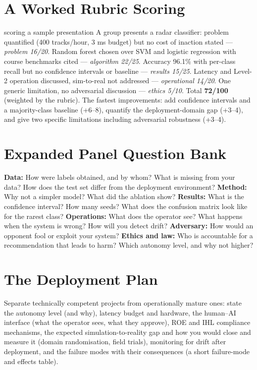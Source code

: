\documentclass[11pt]{article}
\begin{document}
\section{A Worked Rubric Scoring}
\begin{example}{scoring a sample presentation}
A group presents a radar classifier: problem quantified (400 tracks/hour, 3 ms budget) but no cost of inaction stated --- \emph{problem 16/20}. Random forest chosen over SVM and logistic regression with course benchmarks cited --- \emph{algorithm 22/25}. Accuracy 96.1\% with per-class recall but no confidence intervals or baseline --- \emph{results 15/25}. Latency and Level-2 operation discussed, sim-to-real not addressed --- \emph{operational 14/20}. One generic limitation, no adversarial discussion --- \emph{ethics 5/10}. Total \textbf{72/100} (weighted by the rubric). The fastest improvements: add confidence intervals and a majority-class baseline (+6--8), quantify the deployment-domain gap (+3--4), and give two specific limitations including adversarial robustness (+3--4).
\end{example}

\section{Expanded Panel Question Bank}
\textbf{Data:} How were labels obtained, and by whom? What is missing from your data? How does the test set differ from the deployment environment? \textbf{Method:} Why not a simpler model? What did the ablation show? \textbf{Results:} What is the confidence interval? How many seeds? What does the confusion matrix look like for the rarest class? \textbf{Operations:} What does the operator see? What happens when the system is wrong? How will you detect drift? \textbf{Adversary:} How would an opponent fool or exploit your system? \textbf{Ethics and law:} Who is accountable for a recommendation that leads to harm? Which autonomy level, and why not higher?

\section{The Deployment Plan}
Separate technically competent projects from operationally mature ones: state the autonomy level (and why), latency budget and hardware, the human--AI interface (what the operator sees, what they approve), ROE and IHL compliance mechanisms, the expected simulation-to-reality gap and how you would close and measure it (domain randomisation, field trials), monitoring for drift after deployment, and the failure modes with their consequences (a short failure-mode and effects table).
\end{document}
